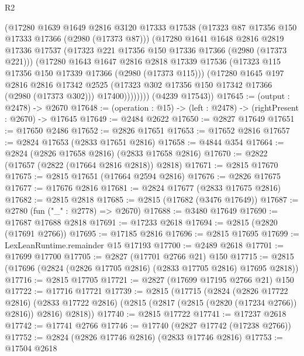 \begin{lexlean}{R2}
\begin{coremodule}
              (@17280
                @1639
                @1649
                @2816
                @3120
                @17333
                @17538
                (@17323 @87 @17356 @150 @17333 @17366 (@2980 (@17373 @87)))
                (@17280
                  @1641
                  @1648
                  @2816
                  @2819
                  @17336
                  @17537
                  (@17323 @221 @17356 @150 @17336 @17366 (@2980 (@17373 @221)))
                  (@17280
                    @1643
                    @1647
                    @2816
                    @2818
                    @17339
                    @17536
                    (@17323 @115 @17356 @150 @17339 @17366 (@2980 (@17373 @115)))
                    (@17280
                      @1645
                      @197
                      @2816
                      @2816
                      @17342
                      @2525
                      (@17323 @302 @17356 @150 @17342 @17366 (@2980 (@17373 @302)))
                      @17400))))))))
      (@4239 @17543))
@17645 := (output : @2478) -> @2670
@17648 := (operation : @15) -> (left : @2478) -> (rightPresent : @2670) -> @17645
@17649 := @2484 @2622
@17650 := @2827 @17649
@17651 := @17650 @2486
@17652 := @2826 @17651
@17653 := @17652 @2816
@17657 := @2824 @17653 (@2833 @17651 @2816)
@17658 := @4844 @354
@17664 := @2824 (@2826 @17658 @2816) (@2833 @17658 @2816)
@17670 := @2822 (@17657 (@2822 (@17664 @2816 @2818)) @2818)
@17671 := @2815 @17670
@17675 := @2815 @17651 (@17664 @2594 @2816)
@17676 := @2826 @17675
@17677 := @17676 @2816
@17681 := @2824 @17677 (@2833 @17675 @2816)
@17682 := @2815 @2818
@17685 := @2815 (@17682 (@3476 @17649))
@17687 := @2780 (fun ("_" : @2778) => @2670)
@17688 := @3480 @17649
@17690 := @17687 @17688 @2818
@17691 := @17233 @2618
@17694 := @2815 (@2820 (@17691 @2766))
@17695 := @17185 @2816
@17696 := @2815 @17695
@17699 := LexLeanRuntime.remainder @15 @17193
@17700 := @2489 @2618
@17701 := @17699 @17700
@17705 := @2827 (@17701 @2766 @21) @150
@17715 := @2815 (@17696 (@2824 (@2826 @17705 @2816) (@2833 @17705 @2816) @17695 @2818))
@17716 := @2815 @17705
@17721 := @2827 (@17699 @17195 @2766 @21) @150
@17722 := @17716 @17721
@17739 := @2815
    (@17715
      (@2824
        (@2826 @17722 @2816)
        (@2833 @17722 @2816)
        (@2815 (@2817 (@2815 (@2820 (@17234 @2766)) @2816)) @2816)
        @2818))
@17740 := @2815 @17722
@17741 := @17237 @2618
@17742 := @17741 @2766
@17746 := @17740 (@2827 @17742 (@17238 @2766))
@17752 := @2824 (@2826 @17746 @2816) (@2833 @17746 @2816)
@17753 := @17504 @2618

\end{coremodule}
\end{lexlean}
